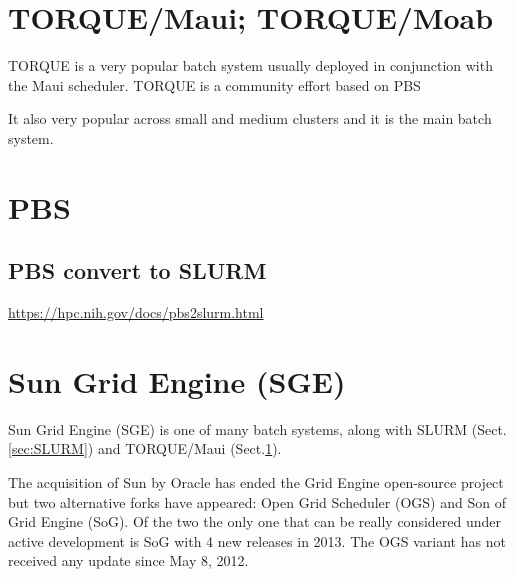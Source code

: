 \chapter{TORQUE/Maui; TORQUE/Moab}
\label{chap:TORQUE}

TORQUE is a very popular batch system usually deployed in conjunction with the
Maui scheduler. TORQUE is a community effort based on PBS

It also very popular across small and medium clusters and it is the main batch
system.

\chapter{PBS}
\label{chap:PBS}


\section{PBS convert to SLURM}
\label{sec:PBS-convert-SLURM-script}

\url{https://hpc.nih.gov/docs/pbs2slurm.html}


\chapter{Sun Grid Engine (SGE)}
\label{chap:SGE}
\label{sec:OGS}
\label{sec:SoG}

Sun Grid Engine (SGE) is one of many batch systems, along with SLURM
(Sect.\ref{sec:SLURM}) and TORQUE/Maui (Sect.\ref{chap:TORQUE}).

The acquisition of Sun by Oracle has ended the Grid Engine open-source project
but two alternative forks have appeared: Open Grid Scheduler (OGS) and Son of
Grid Engine (SoG). Of the two the only one that can be really considered under
active development is SoG with 4 new releases in 2013. The OGS variant has not
received any update since May 8, 2012.
